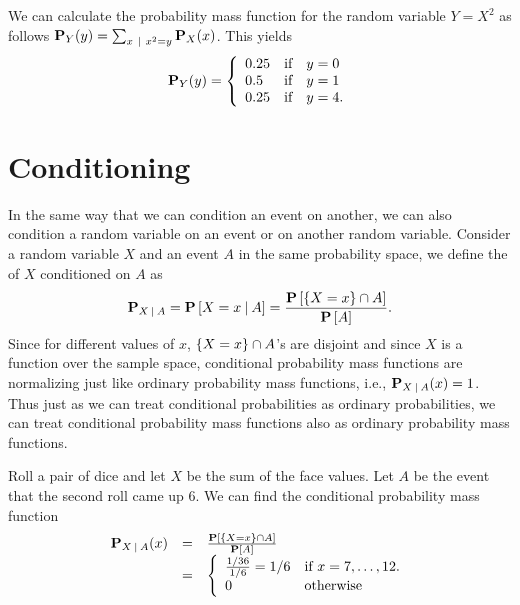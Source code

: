 \begin{flex}
\begin{example}
We can calculate the probability mass function for the random variable
$Y = X^2$ as follows $\mathbf{P}_{Y}(y) = \sum_{x ~\mid~ x^2 =
  y}\mathbf{P}_{X}(x)$.
%
This yields
\[
\mathbf{P}_{Y}(y) = 
\left\{
\begin{array}{lll}
0.25  & \mbox{if} & y = 0
\\
0.5  & \mbox{if} & y = 1
\\
0.25  & \mbox{if} & y = 4.
\end{array}
\right.
\]

\end{example}
\end{flex}

\section{Conditioning}
\label{sec:probability::randvar::conditioning}

\begin{flex}

In the same way that we can condition an event on another, we can also
condition a random variable on an event or on another random variable.
%
Consider a random variable $X$ and an event $A$ in the same probability
space, we define the  of
$X$ conditioned on  $A$ as 
\[
\mathbf{P}_{X {\:\mid\:} A} = \mathbf{P}\left[{X = x {\:\mid\:} A}\right] = \frac{\mathbf{P}\left[{\{X =x\} \cap A}\right]}{\mathbf{P}\left[{A}\right]}.
\]
%
Since for different values of $x$, $\{X =x\} \cap A$'s are
disjoint and since $X$ is a function over the sample space,
conditional probability mass functions are normalizing just like
ordinary probability mass functions, i.e., $\mathbf{P}_{X {\:\mid\:} A}(x) = 1$.
%
Thus just as we can treat conditional probabilities as ordinary
probabilities, we can treat conditional probability  mass functions
also as ordinary probability mass functions.



\begin{example}
Roll a pair of dice and let $X$ be the sum of the face values.  Let
$A$ be the event that the second roll came up $6$.
%
We can find the conditional probability mass function 
\[
\begin{array}{lll}
\mathbf{P}_{X {\:\mid\:} A}(x) & = & \frac{\mathbf{P}\left[{\{X =x\} \cap A}\right]}{\mathbf{P}\left[{A}\right]}
\\
& = & 
\left\{
\begin{array}{ll}
\frac{1/36}{1/6} = 1/6 & \mbox{if}~x = 7,  \ldots, 12.
\\
0 & \mbox{otherwise}
\end{array}
\right.
\end{array}
\]
 
\end{example}
\end{flex}

